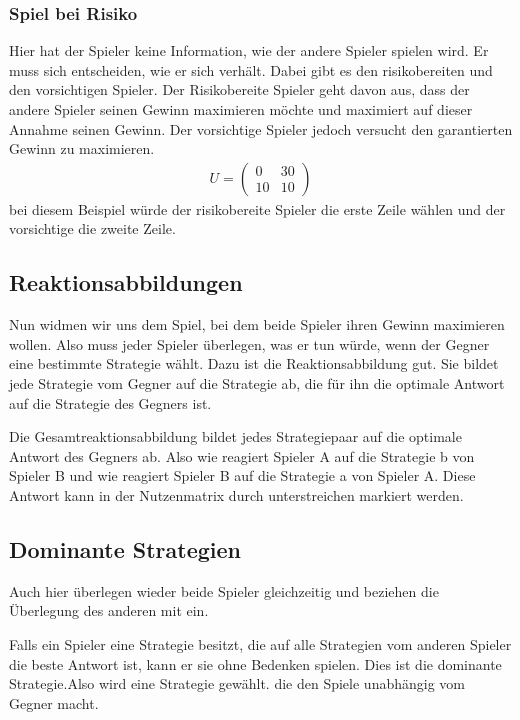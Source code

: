 \documentclass[]{article}
\begin{document}
\subsubsection{Spiel bei Risiko}
Hier hat der Spieler keine Information, wie der andere Spieler spielen wird. Er muss sich entscheiden, wie er sich verhält. Dabei gibt es den risikobereiten und den vorsichtigen Spieler. Der Risikobereite Spieler geht davon aus, dass der andere Spieler seinen Gewinn maximieren möchte und maximiert auf dieser Annahme seinen Gewinn. Der vorsichtige Spieler jedoch versucht den garantierten Gewinn zu maximieren. 
\begin{align*}
	U=\begin{pmatrix}
	0 & 30 \\ 10 & 10
	\end{pmatrix}
\end{align*}
bei diesem Beispiel würde der risikobereite Spieler die erste Zeile wählen und der vorsichtige die zweite Zeile. 

\subsection{Reaktionsabbildungen}
Nun widmen wir uns dem Spiel, bei dem beide Spieler ihren Gewinn maximieren wollen. Also muss jeder Spieler überlegen, was er tun würde, wenn der Gegner eine bestimmte Strategie wählt. Dazu ist die Reaktionsabbildung gut. Sie bildet jede Strategie vom Gegner auf die Strategie ab, die für ihn die  optimale Antwort auf die Strategie des Gegners ist. 

Die Gesamtreaktionsabbildung bildet jedes Strategiepaar auf die optimale Antwort des Gegners ab. Also wie reagiert Spieler A auf die Strategie b von Spieler B und wie reagiert Spieler B auf die Strategie a von Spieler A. Diese Antwort kann in der Nutzenmatrix durch unterstreichen markiert werden.

\subsection{Dominante Strategien}
Auch hier überlegen wieder beide Spieler gleichzeitig und beziehen die Überlegung des anderen mit ein.

Falls ein Spieler eine Strategie besitzt, die auf alle Strategien vom anderen Spieler die beste Antwort ist, kann er sie ohne Bedenken spielen. Dies ist die dominante Strategie.Also wird eine Strategie gewählt. die den Spiele unabhängig vom Gegner macht. 
\end{document}
